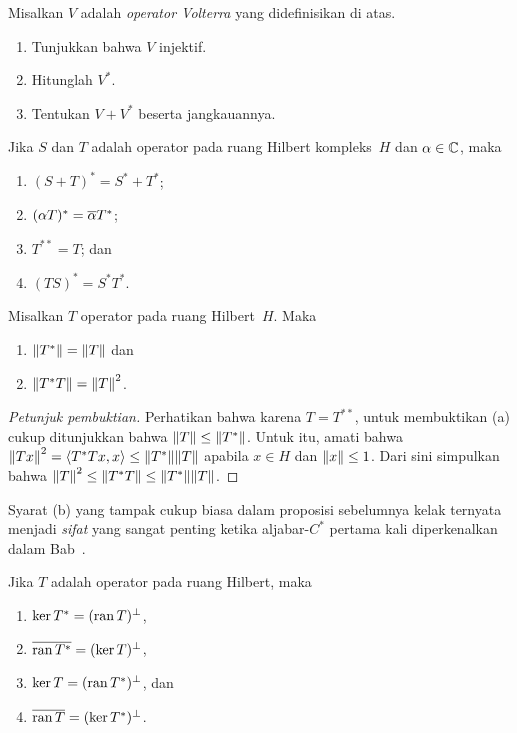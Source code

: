 \begin{exer} Misalkan $V$ adalah \emph{operator Volterra} yang didefinisikan di atas.
 \begin{enumerate}
  \item[(a)] Tunjukkan bahwa $V$ injektif.
  \item[(b)] Hitunglah $V^*$.
  \item[(c)] Tentukan $V + V^*$ beserta jangkauannya.
 \end{enumerate}
\end{exer}

\begin{prop}\label{prop_adj_invol} Jika $S$ dan $T$ adalah operator pada ruang Hilbert kompleks~$H$ dan $\alpha \in \mathbb{C}$, maka
 \begin{enumerate}[label=\rm{(\alph*)}]
  \item $(S + T)^* = S^* + T^*$;
  \item $(\alpha T)^* = \overline{\alpha} T^*$;
  \item $T^{**} = T$; dan
  \item $(TS)^* = S^*T^*$.
 \end{enumerate}
\end{prop}

\begin{prop}\label{C063544} Misalkan $T$ operator pada ruang Hilbert~$H$. Maka
   \begin{enumerate}[label=\rm{(\alph*)}]
     \item $\lVert T^*\rVert = \lVert T\rVert$ dan
     \item $\lVert T^*T\rVert = {\lVert T\rVert}^2$.
   \end{enumerate}
\end{prop}

\begin{proof}[\emph{Petunjuk pembuktian}] Perhatikan bahwa karena $T = T^{**}$, untuk membuktikan (a) cukup ditunjukkan bahwa $\lVert T\rVert \le \lVert T^*\rVert$.
Untuk itu, amati bahwa ${\lVert Tx\rVert}^2 = \langle T^*Tx,x \rangle \le \lVert T^*\rVert\lVert T\rVert$ apabila $x \in H$ dan $\lVert x\rVert \le 1$. Dari sini
simpulkan bahwa ${\lVert T\rVert}^2 \le \lVert T^*T\rVert \le \lVert T^*\rVert\lVert T\rVert$.  \ns
\end{proof}

Syarat (b) yang tampak cukup biasa dalam proposisi sebelumnya kelak ternyata menjadi \emph{sifat} yang sangat penting
ketika aljabar-$C^*$ pertama kali diperkenalkan dalam Bab~.

\begin{prop}\label{prop_ker_adj_perp_ran_op} Jika $T$ adalah operator pada ruang Hilbert, maka
 \begin{enumerate}[label=\rm{(\alph*)}]
   \item $\ker T^* = (\operatorname{ran} T)^\perp$,
   \item $\overline{\operatorname{ran} T^*} = (\ker T)^\perp$,
   \item $\ker T = (\operatorname{ran} T^*)^\perp$, dan
   \item $\overline{\operatorname{ran} T} = (\ker T^*)^\perp$.
 \end{enumerate}
\end{prop}

